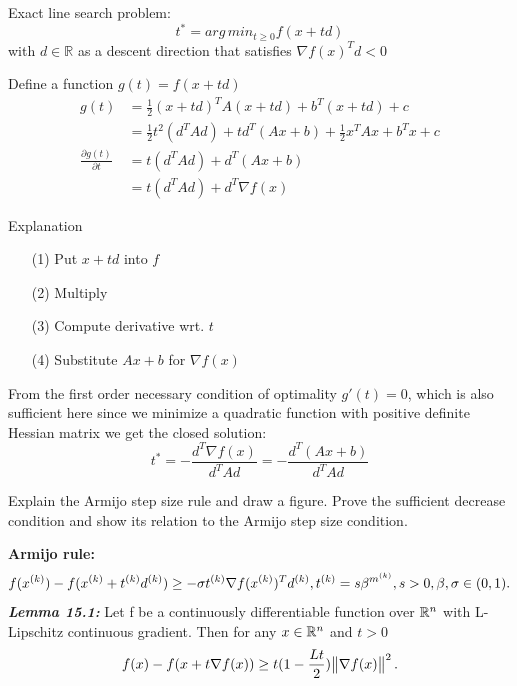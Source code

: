 \documentclass[12pt,a4paper]{article}
\begin{document}
Exact line search problem:
\begin{equation*}
    t^*=arg\,min_{t \geq 0} f(x + td)
\end{equation*}
with $d \in \mathbb{R} $ as a descent direction that satisfies $\nabla f(x)^Td < 0 $

Define a function $g(t)=f(x+td)$
\begin{align}
    g(t) &= \frac{1}{2}(x+td)^TA(x+td) + b^T(x+td) + c\\
    &= \frac{1}{2}t^2(d^TAd) + td^T(Ax+b) + \frac{1}{2}x^TAx + b^Tx + c\\
    \frac{\partial g(t)}{\partial t} &= t(d^TAd) + d^T(Ax+b)\\
    &= t(d^TAd) + d^T\nabla f(x)
\end{align}

Explanation
\begin{enumerate}
    \item[(1)] Put $x+td$ into $f$
    \item[(2)] Multiply
    \item[(3)] Compute derivative wrt. $t$
    \item[(4)] Substitute $Ax+b$ for $\nabla f(x)$
\end{enumerate}

From the first order necessary condition of optimality $g'(t)=0$, which is also sufficient here since we minimize a quadratic function with positive definite Hessian matrix we get the closed solution:
\begin{equation*}
    t^* = -\frac{d^T\nabla f(x)}{d^TAd} = -\frac{d^T(Ax+b)}{d^TAd}
\end{equation*}

\begin{question}
Explain the Armijo step size rule and draw a figure. Prove the sufficient decrease condition and show its relation to the Armijo step size condition.
\end{question}

	\textbf{Armijo rule:}
	\begin{equation*}
     f(x^{(k)}) - f(x^{(k)} + t^{(k)}d^{(k)}) \geq - \sigma t^{(k)}  \nabla f(x^{(k)})^Td^{(k)}, t^{(k)}=s \beta^{m^{(k)}}, s > 0, \beta,\sigma \in (0,1).
	\end{equation*}
	\textbf{\textit{Lemma 15.1:}} Let f be a continuously differentiable function over $\mathbb{R}^n$ with L-Lipschitz continuous gradient. Then for any $x \in \mathbb{R}^n$ and $t > 0$ 
	\begin{equation*}
	    f(x) - f(x + t\nabla f(x)) \geq t(1-\frac{Lt}{2})\norm{\nabla f(x)}^2.
	\end{equation*}
	
\end{document}
